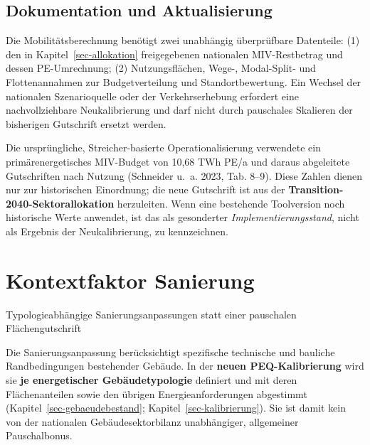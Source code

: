 \documentclass[
  ngerman,
  a4paper,
  DIV=11]{scrreprt}
\begin{document}
\section{Dokumentation und
Aktualisierung}\label{dokumentation-und-aktualisierung}

Die Mobilitätsberechnung benötigt zwei unabhängig überprüfbare
Datenteile: (1) den in Kapitel~\ref{sec-allokation} freigegebenen
nationalen MIV-Restbetrag und dessen PE-Umrechnung; (2) Nutzungsflächen,
Wege-, Modal-Split- und Flottenannahmen zur Budgetverteilung und
Standortbewertung. Ein Wechsel der nationalen Szenarioquelle oder der
Verkehrserhebung erfordert eine nachvollziehbare Neukalibrierung und
darf nicht durch pauschales Skalieren der bisherigen Gutschrift ersetzt
werden.

\begin{tcolorbox}[enhanced jigsaw, arc=.35mm, bottomrule=.15mm, bottomtitle=1mm, breakable, colback=white, colbacktitle=quarto-callout-note-color!10!white, colframe=quarto-callout-note-color-frame, coltitle=black, left=2mm, leftrule=.75mm, opacityback=0, opacitybacktitle=0.6, rightrule=.15mm, title=\textcolor{quarto-callout-note-color}{\faInfo}\hspace{0.5em}{Historischer Bewertungsstand}, titlerule=0mm, toprule=.15mm, toptitle=1mm]

Die ursprüngliche, Streicher-basierte Operationalisierung verwendete ein
primärenergetisches MIV-Budget von 10,68 TWh PE/a und daraus abgeleitete
Gutschriften nach Nutzung (Schneider u.~a. 2023, Tab. 8--9). Diese
Zahlen dienen nur zur historischen Einordnung; die neue Gutschrift ist
aus der \textbf{Transition-2040-Sektorallokation} herzuleiten. Wenn eine
bestehende Toolversion noch historische Werte anwendet, ist das als
gesonderter \emph{Implementierungsstand}, nicht als Ergebnis der
Neukalibrierung, zu kennzeichnen.

\end{tcolorbox}

\chapter{Kontextfaktor Sanierung}\label{sec-kontext-sanierung}

Typologieabhängige Sanierungsanpassungen statt einer pauschalen
Flächengutschrift

Die Sanierungsanpassung berücksichtigt spezifische technische und
bauliche Randbedingungen bestehender Gebäude. In der \textbf{neuen
PEQ-Kalibrierung} wird sie \textbf{je energetischer Gebäudetypologie}
definiert und mit deren Flächenanteilen sowie den übrigen
Energieanforderungen abgestimmt (Kapitel~\ref{sec-gebaeudebestand};
Kapitel~\ref{sec-kalibrierung}). Sie ist damit kein von der nationalen
Gebäudesektorbilanz unabhängiger, allgemeiner Pauschalbonus.
\end{document}
